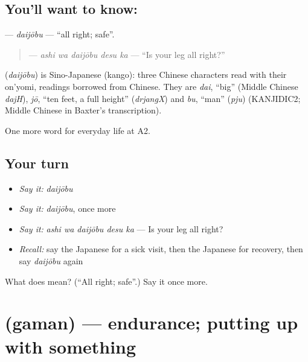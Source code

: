 \subsection*{You'll want to know: }
\textbf{} — \emph{daijōbu} — \textquotedblleft{}all right; safe\textquotedblright{}.

\begin{quote}
\textbf{ } — \emph{ashi wa daijōbu desu ka} — \textquotedblleft{}Is your leg all right?\textquotedblright{}
\end{quote}

\begin{cousinweb}
\textbf{} (\emph{daijōbu}) is Sino-Japanese (kango): three Chinese characters read with their on'yomi, readings borrowed from Chinese. They are \emph{dai}, \textquotedblleft{}big\textquotedblright{} (Middle Chinese \emph{dajH}), \emph{jō}, \textquotedblleft{}ten feet, a full height\textquotedblright{} (\emph{drjangX}) and \emph{bu}, \textquotedblleft{}man\textquotedblright{} (\emph{pju}) (KANJIDIC2; Middle Chinese in Baxter's transcription).
\end{cousinweb}

\begin{grammarlens}[title={What you've built}]
One more word for everyday life at A2.
\end{grammarlens}

\subsection*{Your turn}
\begin{itemize}
\raggedright
  \item \emph{Say it:} \emph{daijōbu}
  \item \emph{Say it:} \emph{daijōbu}, once more
  \item \emph{Say it:} \emph{ashi wa daijōbu desu ka} — Is your leg all right?
  \item \emph{Recall:} say the Japanese for a sick visit, then the Japanese for recovery, then say \emph{daijōbu} again
\end{itemize}

\begin{tcolorbox}[breakable,colback=teal!4,colframe=teal!35!black,title={Before you move on}]
What does  mean? (\textquotedblleft{}All right; safe\textquotedblright{}.) Say it once more.
\end{tcolorbox}
\section[\texorpdfstring{\ja{がまん} (gaman)}{がまん (gaman)}]{ (gaman) — endurance; putting up with something}

